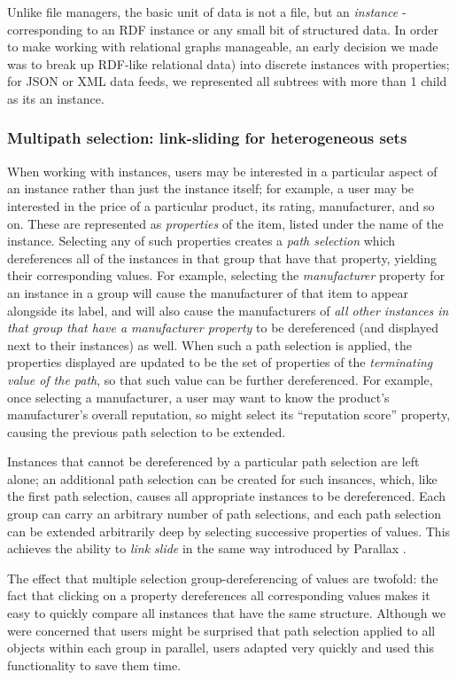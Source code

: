 \documentclass{sigchi}
\begin{document}
Unlike file managers, the basic unit of data is not a file, but an \emph{instance} - corresponding to an RDF instance or any small bit of structured data. In order to make working with relational graphs manageable, an early decision we made was to break up RDF-like relational data) into discrete instances with properties; for JSON or XML data feeds, we represented all subtrees with more than 1 child as its an instance.  

\subsubsection{Multipath selection: link-sliding for heterogeneous sets}
When working with instances, users may be interested in a particular aspect of an instance rather than just the instance itself; for example, a user may be interested in the price of a particular product, its rating, manufacturer, and so on.  These are represented as \emph{properties} of the item, listed under the name of the instance.  Selecting any of such properties creates a \emph{path   selection} which dereferences all of the instances in that group that have that property, yielding their corresponding values.  For example, selecting the \emph{manufacturer} property for an instance in a group will cause the manufacturer of that item to appear alongside its label, and will also cause the manufacturers of \emph{all other   instances in that group that have a manufacturer property} to be dereferenced (and displayed next to their instances) as well.  When such a path selection is applied, the properties displayed are updated to be the set of properties of the \emph{terminating value of the path}, so that such value can be further dereferenced.  For example, once selecting a manufacturer, a user may want to know the product's manufacturer's overall reputation, so might select its ``reputation score'' property, causing the previous path selection to be extended.

Instances that cannot be dereferenced by a particular path selection  are left alone; an additional path selection can be created for such insances, which, like the first path selection, causes all appropriate instances to be dereferenced.  Each group can carry an arbitrary number of path selections, and each path selection can be extended arbitrarily deep by selecting successive properties of values. This achieves the ability to \emph{link slide} in the same way introduced by Parallax \cite{parallax}.  
 
The effect that multiple selection group-dereferencing of values are twofold: the fact that clicking on a property dereferences all corresponding values makes it easy to quickly compare all instances that have the same structure.  Although we were concerned that users might be surprised that path selection applied to all objects within each group in parallel, users adapted very quickly and used this functionality to save them time.   
\end{document}

